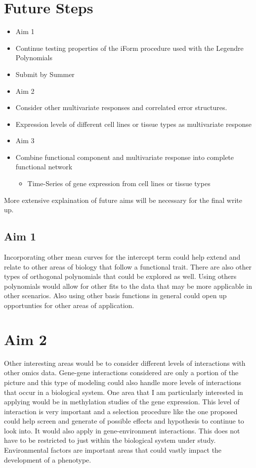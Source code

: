 \documentclass[11pt,]{book}
\providecommand{\tightlist}{%
  \setlength{\itemsep}{0pt}\setlength{\parskip}{0pt}}
\theoremstyle{definition}
\theoremstyle{definition}
\theoremstyle{remark}
\begin{document}
\section{Future Steps}\label{future-steps}

\begin{itemize}
\item
  Aim 1
\item
  Continue testing properties of the iForm procedure used with the
  Legendre Polynomials
\item
  Submit by Summer
\item
  Aim 2
\item
  Consider other multivariate responses and correlated error
  structures.\\
\item
  Expression levels of different cell lines or tissue types as
  multivariate response
\item
  Aim 3
\item
  Combine functional component and multivariate response into complete
  functional network

  \begin{itemize}
  \tightlist
  \item
    Time-Series of gene expression from cell lines or tissue types
  \end{itemize}
\end{itemize}

More extensive explaination of future aims will be necessary for the
final write up.

\subsection{Aim 1}\label{aim-1}

Incorporating other mean curves for the intercept term could help extend
and relate to other areas of biology that follow a functional trait.
There are also other types of orthogonal polynomials that could be
explored as well. Using others polynomials would allow for other fits to
the data that may be more applicable in other scenarios. Also using
other basis functions in general could open up opportunties for other
areas of application.

\section{Aim 2}\label{aim-2}

Other interesting areas would be to consider different levels of
interactions with other omics data. Gene-gene interactions considered
are only a portion of the picture and this type of modeling could also
handle more levels of interactions that occur in a biological system.
One area that I am particularly interested in applying would be in
methylation studies of the gene expression. This level of interaction is
very important and a selection procedure like the one proposed could
help screen and generate of possible effects and hypothesis to continue
to look into. It would also apply in gene-environment interactions. This
does not have to be restricted to just within the biological system
under study. Environmental factors are important areas that could vastly
impact the development of a phenotype.
\end{document}
